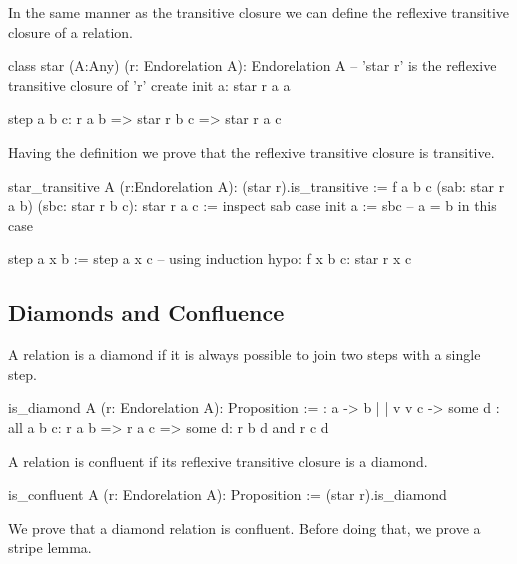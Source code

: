 In the same manner as the transitive closure we can define the reflexive
transitive closure of a relation.

\begin{alba}
  class
    star (A:Any) (r: Endorelation A): Endorelation A
      -- 'star r' is the reflexive transitive closure of 'r'
  create
    init a:
      star r a a

    step a b c:
      r a b
      => star r b c
      => star r a c
\end{alba}

Having the definition we prove that the reflexive transitive closure is
transitive.

\begin{alba}
  star_transitive A (r:Endorelation A): (star r).is_transitive :=
    f a b c (sab: star r a b) (sbc: star r b c): star r a c :=
      inspect
        sab
      case
        init a :=
          sbc
            -- a = b in this case

        step a x b :=
          step a x c
            -- using induction hypo: f x b c: star r x c
\end{alba}


\subsection{Diamonds and Confluence}


A relation is a diamond if it is always possible to join two steps with a
single step.

\begin{alba}
  is_diamond A (r: Endorelation A): Proposition :=
      {:   a  ->  b
           |      |
           v      v
           c  -> some d :}
    all a b c:
      r a b
      => r a c
      => some d: r b d and r c d
\end{alba}


A relation is confluent if its reflexive transitive closure is a diamond.

\begin{alba}
  is_confluent A (r: Endorelation A): Proposition :=
    (star r).is_diamond
\end{alba}



We prove that a diamond relation is confluent. Before doing that, we prove a
stripe lemma.

